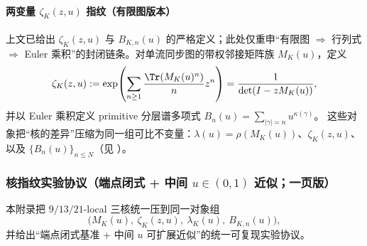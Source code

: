 \paragraph{两变量 \texorpdfstring{$\zeta_K(z,u)$}{zeta(z,u)} 指纹（有限图版本）}
上文已给出 $\zeta_K(z,u)$ 与 $B_{K,n}(u)$ 的严格定义；此处仅重申“有限图 $\Rightarrow$ 行列式 $\Rightarrow$ Euler 乘积”的封闭链条。对单流同步图的带权邻接矩阵族 $M_K(u)$，定义
\[
\zeta_K(z,u)
:=\exp\!\left(\sum_{n\ge 1}\frac{\Tr(M_K(u)^n)}{n}z^n\right)
=\frac{1}{\det(I-zM_K(u))},
\]
并以 Euler 乘积定义 primitive 分层谱多项式
\(
B_n(u)=\sum_{|\gamma|=n}u^{\kappa(\gamma)}
\)。
这些对象把“核的差异”压缩为同一组可比不变量：$\lambda(u)=\rho(M_K(u))$、$\zeta_K(z,u)$、以及 $\{B_n(u)\}_{n\le N}$（见 \cite{Ruelle1976ZetaExpanding,ParryPollicott1990Zeta,BrinStuck2002}）。

\subsubsection{核指纹实验协议（端点闭式 + 中间 \texorpdfstring{$u\in(0,1)$}{u in (0,1)} 近似；一页版）}\label{app:kernel-fingerprint-protocol}
本附录把 $9/13/21$-local 三核统一压到同一对象组
\[
\bigl(M_K(u),\ \zeta_K(z,u),\ \lambda_K(u),\ B_{K,n}(u)\bigr),
\]
并给出“端点闭式基准 + 中间 $u$ 可扩展近似”的统一可复现实验协议。

